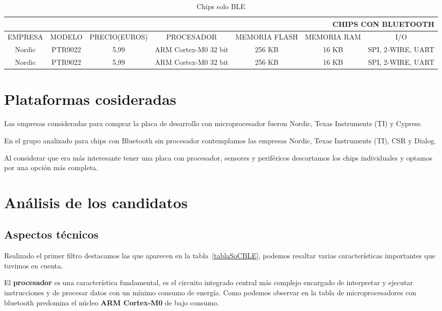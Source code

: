 \begin{table}
	\begin{center}
	\begin{tabular}[c]{|c|c|c|c|c|c|c|}
        \hline
        \multicolumn{7}{r}{CHIPS CON BLUETOOTH} \\
        \hline
        EMPRESA & MODELO & PRECIO(EUROS) & PROCESADOR & MEMORIA FLASH & MEMORIA RAM & I/O \\
        \hline
        Nordic & PTR9022 & 5,99 & ARM Cortex-M0 32 bit & 256 KB & 16 KB & SPI, 2-WIRE, UART \\
        Nordic & PTR9022 & 5,99 & ARM Cortex-M0 32 bit & 256 KB & 16 KB & SPI, 2-WIRE, UART \\
    	\hline
	\end{tabular}
    \caption{Chips solo BLE}
    \label{tablaBLE}
   \end{center}
\end{table}

\section{Plataformas cosideradas}
\label{makereference3.2}

Las empresas consideradas para comprar la placa de desarrollo con microprocesador fueron Nordic, Texas Instruments (TI) y Cypress.

En el grupo analizado para chips con Bluetooth sin procesador contemplamos las empresas Nordic, Texas Instruments (TI), CSR y Dialog. 

Al considerar que era más interesante tener una placa con procesador, sensores y periféricos descartamos los chips individuales y optamos por una opción más completa.

\section{Análisis de los candidatos}
\label{makereference3.3}

\subsection{Aspectos técnicos}
\label{makereference3.3.1}

Realizado el primer filtro destacamos las que aparecen en la tabla~\ref{tablaSoCBLE}, podemos resaltar varias características importantes que tuvimos en cuenta.

El \textbf{procesador} es una característica fundamental, es el circuito integrado central más complejo encargado de interpretar y ejecutar instrucciones y de procesar datos con un mínimo consumo de energía. 
Como podemos observar en la tabla de microprocesadores con bluetooth predomina el núcleo \textbf{ARM Cortex-M0} de bajo consumo.

